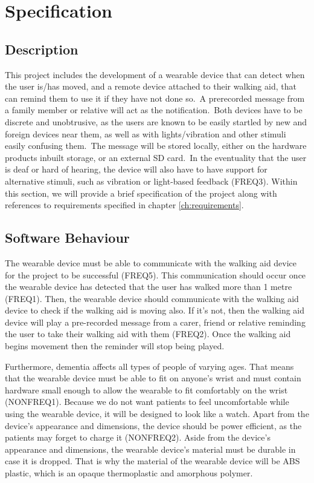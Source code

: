 \chapter{Specification}\label{ch:specification}
    \section{Description}

        This project includes the development of a wearable device that can detect when the user is/has moved,
        and a remote device attached to their walking aid, that can remind them to use it if they have not done
        so.\ A prerecorded message from a family member or relative will act as the notification.\ Both devices have to
        be discrete and unobtrusive, as the users are known to be easily startled by new and foreign devices near them,
        as well as with lights/vibration and other stimuli easily confusing them.\ The message will be stored locally,
        either on the hardware products inbuilt storage, or an external SD card.\ In the eventuality that the user is
        deaf or hard of hearing, the device will also have to have support for alternative stimuli, such as vibration
        or light-based feedback (FREQ3). Within this section, we will provide a brief specification of the project along with
        references to requirements specified in chapter \ref{ch:requirements}.

    \section{Software Behaviour}
        The wearable device must be able to communicate with the walking aid device for the project to be successful
        (FREQ5). This communication should occur once the wearable device has detected that the user has walked more
        than 1 metre (FREQ1). Then, the wearable device should communicate with the walking aid device to check if the
        walking aid is moving also. If it's not, then the walking aid device will play a pre-recorded message from a
        carer, friend or relative reminding the user to take their walking aid with them (FREQ2). Once the walking aid
        begins movement then the reminder will stop being played.

        Furthermore, dementia affects all types of people of varying ages. That means that the wearable device must be
        able to fit on anyone's wrist and must contain hardware small enough to allow the wearable to fit comfortably on
        the wrist (NONFREQ1). Because we do not want patients to feel uncomfortable while using the wearable device, it
        will be designed to look like a watch. Apart from the device's appearance and dimensions, the device should be
        power efficient, as the patients may forget to charge it (NONFREQ2). Aside from the device's appearance and
        dimensions, the wearable device's material must be durable in case it is dropped. That is why the material of
        the wearable device will be ABS plastic, which is an opaque thermoplastic and amorphous polymer.

